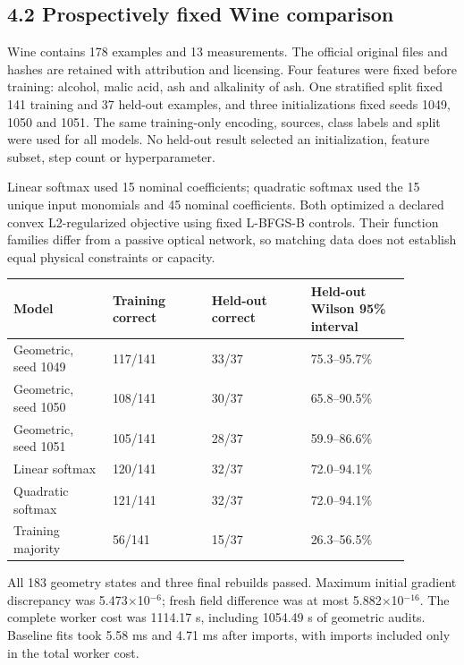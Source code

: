 \documentclass[11pt]{article}
\begin{document}
\subsection*{4.2 Prospectively fixed Wine comparison}

Wine contains 178 examples and 13 measurements. The official original files and hashes are retained with attribution and licensing. Four features were fixed before training: alcohol, malic acid, ash and alkalinity of ash. One stratified split fixed 141 training and 37 held-out examples, and three initializations fixed seeds 1049, 1050 and 1051. The same training-only encoding, sources, class labels and split were used for all models. No held-out result selected an initialization, feature subset, step count or hyperparameter.

Linear softmax used 15 nominal coefficients; quadratic softmax used the 15 unique input monomials and 45 nominal coefficients. Both optimized a declared convex L2-regularized objective using fixed L-BFGS-B controls. Their function families differ from a passive optical network, so matching data does not establish equal physical constraints or capacity.

\begin{small}\begin{longtable}{@{}p{0.22\linewidth} p{0.22\linewidth} p{0.22\linewidth} p{0.22\linewidth}@{}}\toprule
Model & Training correct & Held-out correct & Held-out Wilson 95\% interval \\
\midrule
Geometric, seed 1049 & 117/141 & 33/37 & 75.3--95.7\% \\
Geometric, seed 1050 & 108/141 & 30/37 & 65.8--90.5\% \\
Geometric, seed 1051 & 105/141 & 28/37 & 59.9--86.6\% \\
Linear softmax & 120/141 & 32/37 & 72.0--94.1\% \\
Quadratic softmax & 121/141 & 32/37 & 72.0--94.1\% \\
Training majority & 56/141 & 15/37 & 26.3--56.5\% \\
\bottomrule\end{longtable}\end{small}

All 183 geometry states and three final rebuilds passed. Maximum initial gradient discrepancy was 5.473$\times$10$^{-6}$; fresh field difference was at most 5.882$\times$10$^{-16}$. The complete worker cost was 1114.17 s, including 1054.49 s of geometric audits. Baseline fits took 5.58 ms and 4.71 ms after imports, with imports included only in the total worker cost.
\end{document}
